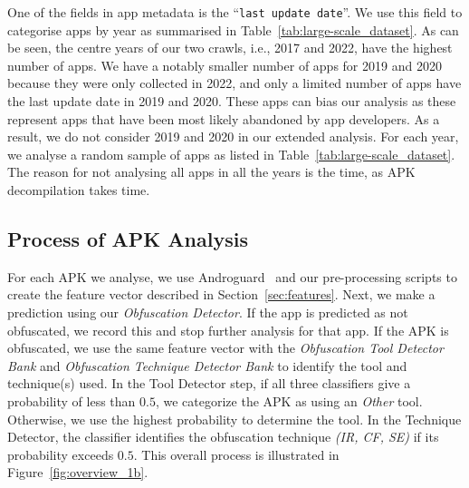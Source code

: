 One of the fields in app metadata is the ``\texttt{last update date}''. We use this field to categorise apps by year as summarised in Table~\ref{tab:large-scale_dataset}. As can be seen, the centre years of our two crawls, i.e., 2017 and 2022, have the highest number of apps. We have a notably smaller number of apps for 2019 and 2020 because they were only collected in 2022, and only a limited number of apps have the last update date in 2019 and 2020. These apps can bias our analysis as these represent apps that have been most likely abandoned by app developers. As a result, we do not consider 2019 and 2020 in our extended analysis. For each year, we analyse a random sample of apps as listed in Table~\ref{tab:large-scale_dataset}. The reason for not analysing all apps in all the years is the time, as APK decompilation takes time. 



\subsection{Process of APK Analysis} For each APK we analyse, we use Androguard~\cite{desnos2018androguard} and our pre-processing scripts to create the feature vector described in Section~\ref{sec:features}. Next, we make a prediction using our \textit{Obfuscation Detector}. If the app is predicted as not obfuscated, we record this and stop further analysis for that app. If the APK is obfuscated, we use the same feature vector with the \textit{Obfuscation Tool Detector Bank} and \textit{Obfuscation Technique Detector Bank} to identify the tool and technique(s) used. In the Tool Detector step, if all three classifiers give a probability of less than $0.5$, we categorize the APK as using an \textit{Other} tool. Otherwise, we use the highest probability to determine the tool. In the Technique Detector, the classifier identifies the obfuscation technique \textit{(IR, CF, SE)} if its probability exceeds $0.5$. This overall process is illustrated in Figure~\ref{fig:overview_1b}.